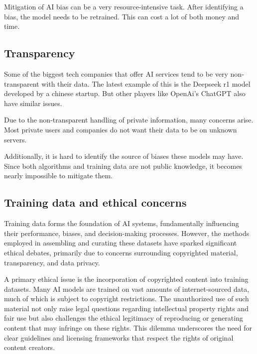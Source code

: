 Mitigation of AI bias can be a very resource-intensive task. After identifying a bias, the model needs to be retrained. This can cost a lot of both money and time. 

\cite{AiDataBias}

\subsection{Transparency}
\label{subsec:transparence}

Some of the biggest tech companies that offer AI services tend to be very non-transparent with their data. 
The latest example of this is the Deepseek r1 model developed by a chinese startup. But other players like OpenAi's ChatGPT also have similar issues.

Due to the non-transparent handling of private information, many concerns arise. Most private users and companies do not want their data to be on unknown servers.

Additionally, it is hard to identify the source of biases these models may have. Since both algorithms and training data are not public knowledge, it becomes nearly impossible to mitigate them.

\cite{larsson2020transparency}

\subsection{Training data and ethical concerns}
\label{subsec:training-data-and-ethical-concerns}

Training data forms the foundation of AI systems, fundamentally influencing their performance, biases, and decision-making processes. However, the methods employed in assembling and curating these datasets have sparked significant ethical debates, primarily due to concerns surrounding copyrighted material, transparency, and data privacy.

A primary ethical issue is the incorporation of copyrighted content into training datasets. Many AI models are trained on vast amounts of internet-sourced data, much of which is subject to copyright restrictions. The unauthorized use of such material not only raise legal questions regarding intellectual property rights and fair use but also challenges the ethical legitimacy of reproducing or generating content that may infringe on these rights. This dilemma underscores the need for clear guidelines and licensing frameworks that respect the rights of original content creators.

